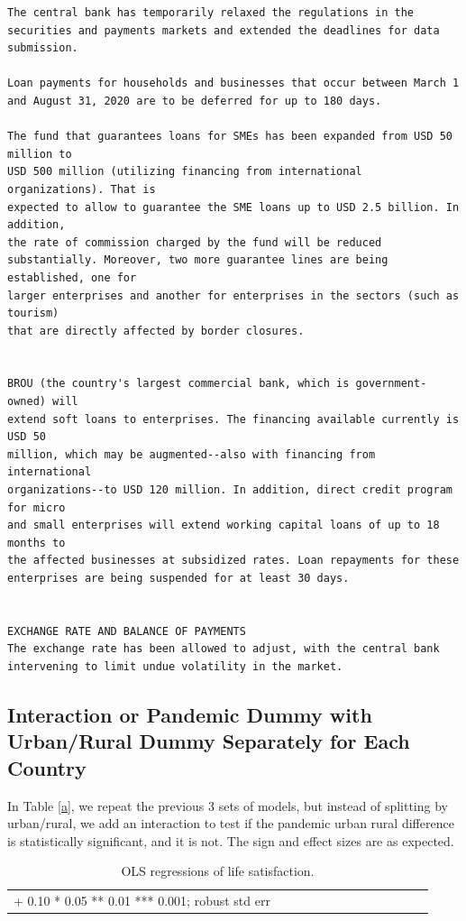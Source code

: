 \documentclass[10pt, letterpaper]{article}
\begin{document}
\begin{spacing}{1.4}
\begin{scriptsize}
\begin{spacing}{.85}
\begin{verbatim}
The central bank has temporarily relaxed the regulations in the securities and payments markets and extended the deadlines for data submission.

Loan payments for households and businesses that occur between March 1 and August 31, 2020 are to be deferred for up to 180 days.

The fund that guarantees loans for SMEs has been expanded from USD 50 million to
USD 500 million (utilizing financing from international organizations). That is
expected to allow to guarantee the SME loans up to USD 2.5 billion. In addition,
the rate of commission charged by the fund will be reduced
substantially. Moreover, two more guarantee lines are being established, one for
larger enterprises and another for enterprises in the sectors (such as tourism)
that are directly affected by border closures.


BROU (the country's largest commercial bank, which is government-owned) will
extend soft loans to enterprises. The financing available currently is USD 50
million, which may be augmented--also with financing from international
organizations--to USD 120 million. In addition, direct credit program for micro
and small enterprises will extend working capital loans of up to 18 months to
the affected businesses at subsidized rates. Loan repayments for these
enterprises are being suspended for at least 30 days. 


EXCHANGE RATE AND BALANCE OF PAYMENTS
The exchange rate has been allowed to adjust, with the central bank intervening to limit undue volatility in the market.
\end{verbatim}
\end{spacing}
\end{scriptsize}

 

\subsection{Interaction or Pandemic Dummy with Urban/Rural Dummy Separately for
  Each Country}
 
In Table \ref{a}, we repeat the previous 3 sets of models, but instead of splitting
by urban/rural, we add an interaction to test if the pandemic urban rural difference
is statistically significant, and it is not. The sign and effect sizes are as expected. 


\begin{spacing}{.9} \begin{table}[H]\centering   \begin{scriptsize} \begin{tabular}{p{1.8in}p{.5in}p{.5in}p{.5in}|p{.5in}p{.5in}p{.5in}|p{.5in}p{.5in}p{.5in}p{.5 in}p{.5in}p{.5 in}}\\  \hline + 0.10 * 0.05 ** 0.01 *** 0.001; robust std err \end{tabular}\end{scriptsize}\caption{\label{abc}OLS regressions of life satisfaction.}\end{table} \end{spacing}


\end{spacing}
\end{document}
